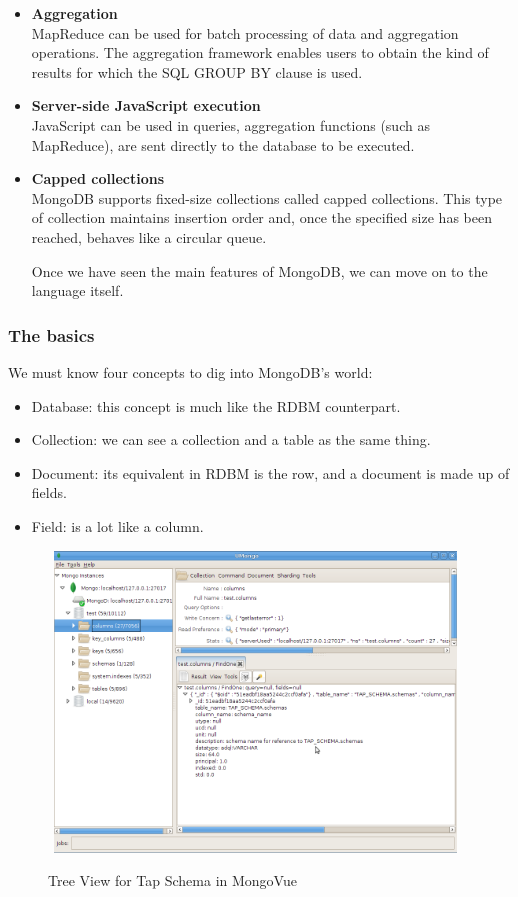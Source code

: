 \begin{itemize}
\item \textbf{Aggregation} \\
MapReduce can be used for batch processing of data and aggregation operations. The aggregation framework enables users to obtain the kind of results for which the SQL GROUP BY clause is used.

\item \textbf{Server-side JavaScript execution} \\
JavaScript can be used in queries, aggregation functions (such as MapReduce), are sent directly to the database to be executed.

\item \textbf{Capped collections} \\
MongoDB supports fixed-size collections called capped collections. This type of collection maintains insertion order and, once the specified size has been reached, behaves like a circular queue.

Once we have seen the main features of MongoDB, we can move on to the language itself.
\end{itemize}


\subsubsection{The basics}

We must know four concepts to dig into MongoDB's world:

\begin{itemize}
\item Database: this concept is much like the RDBM counterpart.
\item Collection: we can see a collection and a table as the same thing.
\item Document: its equivalent in RDBM is the row, and a document is made up of fields.
\item Field: is a lot like a column.
\end{itemize}


\begin{figure}[H]
\centering
\includegraphics[width=11cm,height=8cm]{images/mongo_dia.png}\\
\caption{Tree View for Tap Schema in MongoVue}
\end{figure}


